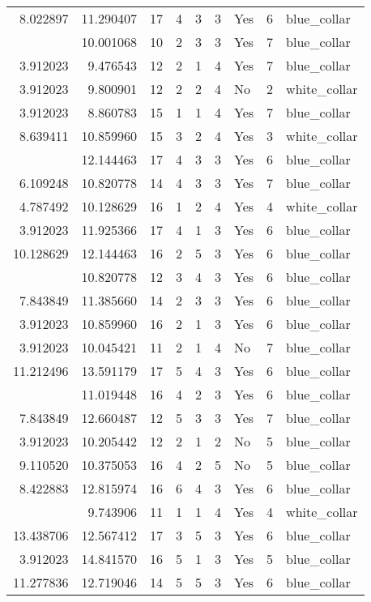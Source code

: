 \documentclass[
]{article}
\begin{document}
\begin{longtable}[t]{rrrrrllrl}
8.022897 & 11.290407 & 17 & 4 & 3 & 3 & Yes & 6 & blue\_collar\\
\addlinespace
5.857933 & 10.001068 & 10 & 2 & 3 & 3 & Yes & 7 & blue\_collar\\
3.912023 & 9.476543 & 12 & 2 & 1 & 4 & Yes & 7 & blue\_collar\\
3.912023 & 9.800901 & 12 & 2 & 2 & 4 & No & 2 & white\_collar\\
3.912023 & 8.860783 & 15 & 1 & 1 & 4 & Yes & 7 & blue\_collar\\
8.639411 & 10.859960 & 15 & 3 & 2 & 4 & Yes & 3 & white\_collar\\
\addlinespace
12.611704 & 12.144463 & 17 & 4 & 3 & 3 & Yes & 6 & blue\_collar\\
6.109248 & 10.820778 & 14 & 4 & 3 & 3 & Yes & 7 & blue\_collar\\
4.787492 & 10.128629 & 16 & 1 & 2 & 4 & Yes & 4 & white\_collar\\
3.912023 & 11.925366 & 17 & 4 & 1 & 3 & Yes & 6 & blue\_collar\\
10.128629 & 12.144463 & 16 & 2 & 5 & 3 & Yes & 6 & blue\_collar\\
\addlinespace
7.882315 & 10.820778 & 12 & 3 & 4 & 3 & Yes & 6 & blue\_collar\\
7.843849 & 11.385660 & 14 & 2 & 3 & 3 & Yes & 6 & blue\_collar\\
3.912023 & 10.859960 & 16 & 2 & 1 & 3 & Yes & 6 & blue\_collar\\
3.912023 & 10.045421 & 11 & 2 & 1 & 4 & No & 7 & blue\_collar\\
11.212496 & 13.591179 & 17 & 5 & 4 & 3 & Yes & 6 & blue\_collar\\
\addlinespace
6.697034 & 11.019448 & 16 & 4 & 2 & 3 & Yes & 6 & blue\_collar\\
7.843849 & 12.660487 & 12 & 5 & 3 & 3 & Yes & 7 & blue\_collar\\
3.912023 & 10.205442 & 12 & 2 & 1 & 2 & No & 5 & blue\_collar\\
9.110520 & 10.375053 & 16 & 4 & 2 & 5 & No & 5 & blue\_collar\\
8.422883 & 12.815974 & 16 & 6 & 4 & 3 & Yes & 6 & blue\_collar\\
\addlinespace
3.912023 & 9.743906 & 11 & 1 & 1 & 4 & Yes & 4 & white\_collar\\
13.438706 & 12.567412 & 17 & 3 & 5 & 3 & Yes & 6 & blue\_collar\\
3.912023 & 14.841570 & 16 & 5 & 1 & 3 & Yes & 5 & blue\_collar\\
11.277836 & 12.719046 & 14 & 5 & 5 & 3 & Yes & 6 & blue\_collar\\

\end{longtable}
\end{document}
